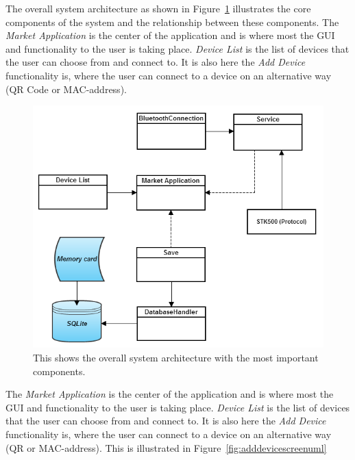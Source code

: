 	The overall system architecture as shown in Figure~\ref{fig:systemarchitecture} illustrates the core components of the system and the relationship between these components. The \textit{Market Application} is the center of the application and is where most the GUI and functionality to the user is taking place. \textit{Device List} is the list of devices that the user can choose from and connect to. It is also here the \textit{Add Device} functionality is, where the user can connect to a device on an alternative way (QR Code or MAC-address).\\

	\begin{figure}[H]
	\centering
	\includegraphics[scale=0.8]{images/System_architecture.png}
	\caption[System Architecture]{This shows the overall system architecture with the most important components.}
	\label{fig:systemarchitecture}
	\end{figure}

	The \textit{Market Application} is the center of the application and is where most the GUI and functionality to the user is taking place. \textit{Device List} is the list of devices that the user can choose from and connect to. It is also here the \textit{Add Device} functionality is, where the user can connect to a device on an alternative way (QR or MAC-address). This is illustrated in Figure~\ref{fig:adddevicescreenuml} \\

